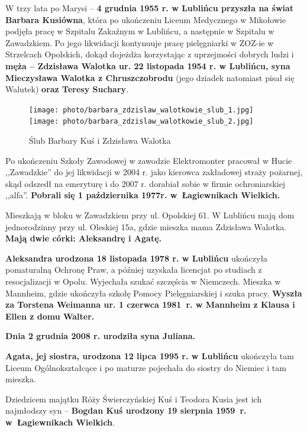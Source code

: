 W trzy lata po Marysi -- \textbf{4 grudnia 1955 r. w Lublińcu przyszła na świat Barbara Kusiówna}, która po ukończeniu Liceum Medycznego w Mikołowie podjęła pracę w Szpitalu Zakaźnym w Lublińcu, a następnie w Szpitalu w Zawadzkiem. Po jego likwidacji kontynuuje pracę pielęgniarki w ZOZ-ie w Strzelcach Opolskich, dokąd dojeżdża korzystając z uprzejmości dobrych ludzi i \textbf{męża -- Zdzisława Walotka ur. 22 listopada 1954 r. w Lublińcu, syna Mieczysława Walotka z Chruszczobrodu} (jego dziadek natomiast pisał się Walutek) \textbf{oraz Teresy Suchary}.

\begin{figure}[!h]
\begin{center}
\texttt{[image: photo/barbara\_zdzislaw\_walotkowie\_slub\_1.jpg]}
\texttt{[image: photo/barbara\_zdzislaw\_walotkowie\_slub\_2.jpg]}
\caption{Ślub Barbary Kuś i Zdzisława Walotka}
\label{rys:barbara_zdzislaw_walotkowie_slub}
\end{center}
\end{figure}

Po ukończeniu Szkoły Zawodowej w zawodzie Elektromonter pracował w Hucie ,,Zawadzkie'' do jej likwidacji w 2004 r. jako kierowca zakładowej straży pożarnej, skąd odszedł na emeryturę i do 2007 r. dorabiał sobie w firmie ochroniarskiej ,,alfa''. \textbf{Pobrali się 1 października 1977r. w~Łagiewnikach Wielkich.}

Mieszkają w bloku w Zawadzkiem przy ul. Opolskiej 61. W Lublińcu mają dom jednorodzinny przy ul. Oleskiej 15a, gdzie mieszka mama Zdzisława Walotka. \textbf{Mają dwie córki: Aleksandrę i Agatę.}

\textbf{Aleksandra urodzona 18 listopada 1978 r. w Lublińcu} ukończyła pomaturalną Ochronę Praw, a później uzyskała licencjat po studiach z resocjalizacji w Opolu. Wyjechała szukać szczęścia w Niemczech. Mieszka w Mannheim, gdzie ukończyła szkołę Pomocy Pielęgniarskiej i szuka pracy. \textbf{Wyszła za Torstena Weimanna ur. 1 czerwca 1981~r. w Mannheim z Klausa i Ellen z domu Walter.}

\textbf{Dnia 2 grudnia 2008 r. urodziła syna Juliana.}

\textbf{Agata, jej siostra, urodzona 12 lipca 1995 r. w Lublińcu} ukończyła tam Liceum Ogólnokształcące i po maturze pojechała do siostry do Niemiec i tam mieszka.


Dziedzicem majątku Róży Świerczyńskiej Kuś i Teodora Kusia jest ich najmłodszy syn -- \textbf{Bogdan Kuś urodzony 19 sierpnia 1959~r. w~Łagiewnikach Wielkich}.

